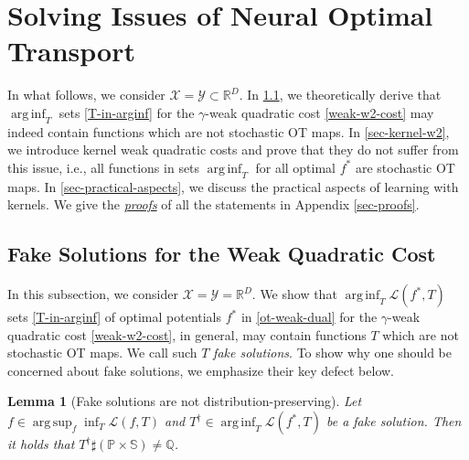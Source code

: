 \documentclass{article} %
\DeclareMathOperator*{\argsup}{arg\,sup}
\DeclareMathOperator*{\arginf}{arg\,inf}
\newtheorem{lemma}{Lemma}
\begin{document}


\vspace{-2mm}\section{Solving Issues of Neural Optimal Transport}

\vspace{-2mm}In what follows, we consider $\mathcal{X}=\mathcal{Y}\subset\mathbb{R}^{D}$. In \wasyparagraph\ref{sec-issues-w2}, we theoretically derive that $\arginf_{T}$ sets \eqref{T-in-arginf} for the $\gamma$-weak quadratic cost \eqref{weak-w2-cost} may indeed contain functions which are not stochastic OT maps. In \wasyparagraph\ref{sec-kernel-w2}, we introduce kernel weak quadratic costs and prove that they do not suffer from this issue, i.e., all functions in sets $\arginf_{T}$ for all optimal $f^{*}$ are stochastic OT maps. In \wasyparagraph\ref{sec-practical-aspects}, we discuss the practical aspects of learning with kernels. We give the \underline{\textit{proofs}} of all the statements in Appendix \ref{sec-proofs}.

\vspace{-2mm}\subsection{Fake Solutions for the Weak Quadratic Cost}
\label{sec-issues-w2}

\vspace{-1.5mm}In this subsection, we consider $\mathcal{X}=\mathcal{Y}=\mathbb{R}^{D}$. We show that $\arginf_{T}\mathcal{L}(f^{*},T)$ sets \eqref{T-in-arginf} of optimal potentials $f^{*}$ in \eqref{ot-weak-dual} for the $\gamma$-weak quadratic cost \eqref{weak-w2-cost}, in general, may contain functions $T$ which are not stochastic OT maps. 
We call such $T$ \textit{fake solutions}. To show why one should be concerned about fake solutions, we emphasize their key defect below.
\vspace{-0.1mm}\begin{lemma}[Fake solutions are not distribution-preserving] Let $f\in\argsup_{f}\inf_{T}\mathcal{L}(f,T)$ and $T^{\dagger}\in \arginf_{T}\mathcal{L}(f^{*},T)$ be a fake solution. Then it holds that $T^{\dagger}\sharp(\mathbb{P}\times\mathbb{S})\neq \mathbb{Q}$.
\label{lemma-fake-problem}
\end{lemma}
\end{document}
